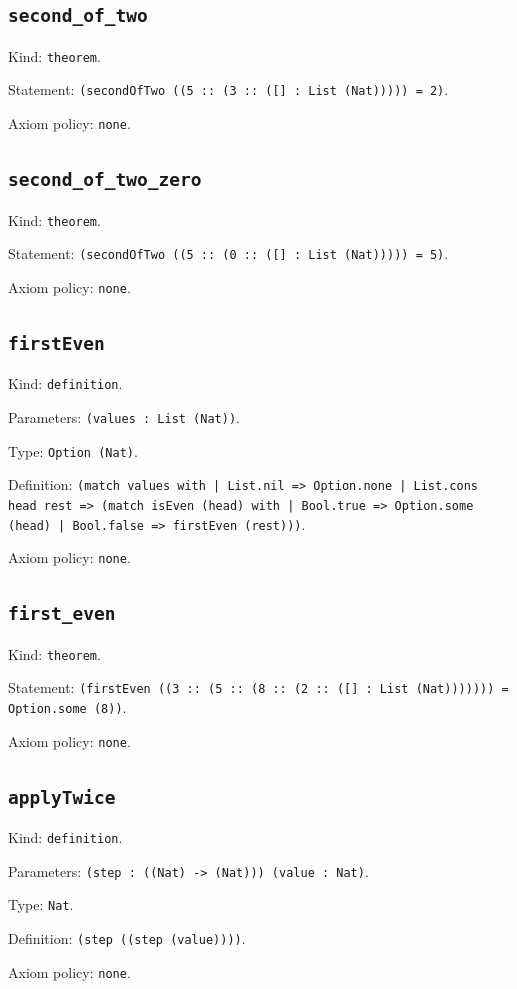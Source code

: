 \documentclass[11pt]{article}
\begin{document}
\subsection*{\texttt{second\_of\_two}}
\noindent Kind: \texttt{theorem}.\par
\noindent Statement: \texttt{(secondOfTwo ((5 :: (3 :: ([] : List (Nat))))) = 2)}.\par
\noindent Axiom policy: \texttt{none}.\par
\subsection*{\texttt{second\_of\_two\_zero}}
\noindent Kind: \texttt{theorem}.\par
\noindent Statement: \texttt{(secondOfTwo ((5 :: (0 :: ([] : List (Nat))))) = 5)}.\par
\noindent Axiom policy: \texttt{none}.\par
\subsection*{\texttt{firstEven}}
\noindent Kind: \texttt{definition}.\par
\noindent Parameters: \texttt{(values : List (Nat))}.\par
\noindent Type: \texttt{Option (Nat)}.\par
\noindent Definition: \texttt{(match values with | List.nil => Option.none | List.cons head rest => (match isEven (head) with | Bool.true => Option.some (head) | Bool.false => firstEven (rest)))}.\par
\noindent Axiom policy: \texttt{none}.\par
\subsection*{\texttt{first\_even}}
\noindent Kind: \texttt{theorem}.\par
\noindent Statement: \texttt{(firstEven ((3 :: (5 :: (8 :: (2 :: ([] : List (Nat))))))) = Option.some (8))}.\par
\noindent Axiom policy: \texttt{none}.\par
\subsection*{\texttt{applyTwice}}
\noindent Kind: \texttt{definition}.\par
\noindent Parameters: \texttt{(step : ((Nat) -> (Nat))) (value : Nat)}.\par
\noindent Type: \texttt{Nat}.\par
\noindent Definition: \texttt{(step ((step (value))))}.\par
\noindent Axiom policy: \texttt{none}.\par
\end{document}
